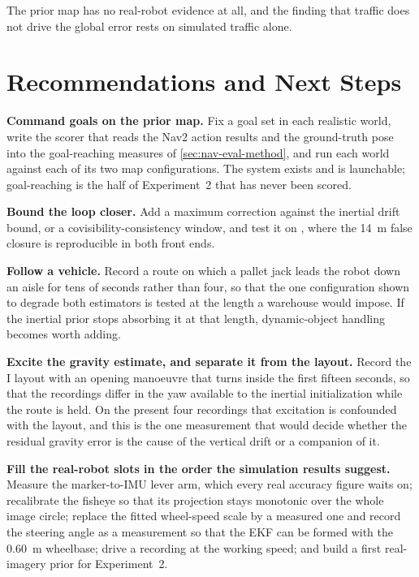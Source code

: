 The prior map has no real-robot evidence at all, and the finding that traffic
does not drive the global error rests on simulated traffic alone.

\section{Recommendations and Next Steps}
\label{sec:recommendations}

\textbf{Command goals on the prior map.} Fix a goal set in each realistic
world, write the scorer that reads the Nav2 action results and the
ground-truth pose into the goal-reaching measures of
\cref{sec:nav-eval-method}, and run each world against each of its two map
configurations. The system exists and is launchable; goal-reaching is the half
of Experiment~2 that has never been scored.

\textbf{Bound the loop closer.} Add a maximum correction against the inertial
drift bound, or a covisibility-consistency window, and test it on
, where the \SI{14}{\metre} false closure is reproducible
in both front ends.

\textbf{Follow a vehicle.} Record a route on which a pallet jack leads the
robot down an aisle for tens of seconds rather than four, so that the one
configuration shown to degrade both estimators is tested at the length a
warehouse would impose. If the inertial prior stops absorbing it at that
length, dynamic-object handling becomes worth adding.

\textbf{Excite the gravity estimate, and separate it from the layout.} Record
the I layout with an opening manoeuvre that turns inside the first fifteen
seconds, so that the recordings differ in the yaw available to the inertial
initialization while the route is held. On the present four recordings that
excitation is confounded with the layout, and this is the one measurement
that would decide whether the residual gravity error is the cause of the
vertical drift or a companion of it.

\textbf{Fill the real-robot slots in the order the simulation results
suggest.} Measure the marker-to-IMU lever arm, which every real accuracy
figure waits on; recalibrate the fisheye so that its projection stays
monotonic over the whole image circle; replace the fitted wheel-speed scale by a measured
one and record the steering angle as a measurement so that the EKF can be
formed with the \SI{0.60}{\metre} wheelbase; drive a recording at the working
speed; and build a first real-imagery prior for Experiment~2.

